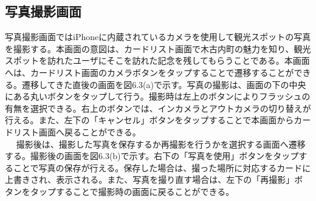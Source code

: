 \subsection{写真撮影画面}
写真撮影画面ではiPhoneに内蔵されているカメラを使用して観光スポットの写真を撮影する。本画面の意図は、カードリスト画面で木古内町の魅力を知り、観光スポットを訪れたユーザにそこを訪れた記念を残してもらうことである。本画面へは、カードリスト画面のカメラボタンをタップすることで遷移することができる。遷移してきた直後の画面を図6.3(a)で示す。写真の撮影は、画面の下の中央にある丸いボタンをタップして行う。撮影時は左上のボタンによりフラッシュの有無を選択できる。右上のボタンでは、インカメラとアウトカメラの切り替えが行える。また、左下の「キャンセル」ボタンをタップすることで本画面からカードリスト画面へ戻ることができる。\\　
撮影後は、撮影した写真を保存するか再撮影を行うかを選択する画面へ遷移する。撮影後の画面を図6.3(b)で示す。右下の「写真を使用」ボタンをタップすることで写真の保存が行える。保存した場合は、撮った場所に対応するカードに上書きされ、表示される。また、写真を撮り直す場合は、左下の「再撮影」ボタンをタップすることで撮影時の画面に戻ることができる。
\newpage

